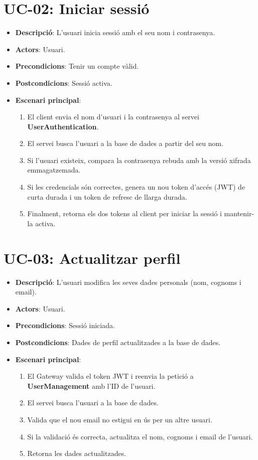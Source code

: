 \section{UC-02: Iniciar sessió}
\begin{itemize}
    \item \textbf{Descripció}: L'usuari inicia sessió amb el seu nom i contrasenya.
    \item \textbf{Actors}: Usuari.
    \item \textbf{Precondicions}: Tenir un compte vàlid.
    \item \textbf{Postcondicions}: Sessió activa.
    \item \textbf{Escenari principal}:
    \begin{enumerate}
        \item El client envia el nom d'usuari i la contrasenya al servei \textbf{UserAuthentication}.
        \item El servei busca l'usuari a la base de dades a partir del seu nom.
        \item Si l'usuari existeix, compara la contrasenya rebuda amb la versió xifrada emmagatzemada.
        \item Si les credencials són correctes, genera un nou token d'accés (JWT) de curta durada i un token de refresc de llarga durada.
        \item Finalment, retorna els dos tokens al client per iniciar la sessió i mantenir-la activa.
    \end{enumerate}
\end{itemize}

\section{UC-03: Actualitzar perfil}
\begin{itemize}
    \item \textbf{Descripció}: L'usuari modifica les seves dades personals (nom, cognoms i email).
    \item \textbf{Actors}: Usuari.
    \item \textbf{Precondicions}: Sessió iniciada.
    \item \textbf{Postcondicions}: Dades de perfil actualitzades a la base de dades.
    \item \textbf{Escenari principal}:
    \begin{enumerate}
        \item El Gateway valida el token JWT i reenvia la petició a \textbf{UserManagement} amb l'ID de l'usuari.
        \item El servei busca l'usuari a la base de dades.
        \item Valida que el nou email no estigui en ús per un altre usuari.
        \item Si la validació és correcta, actualitza el nom, cognoms i email de l'usuari.
        \item Retorna les dades actualitzades.
    \end{enumerate}
\end{itemize}

